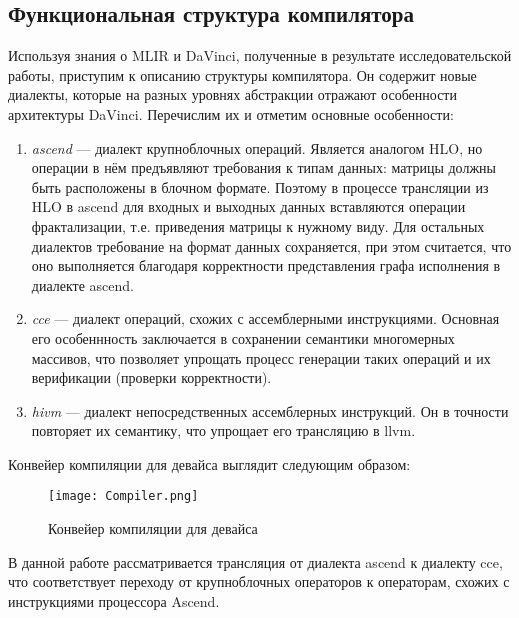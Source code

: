 \subsection{Функциональная структура компилятора}
\label{impl:compiler} %

Используя знания о MLIR и DaVinci, полученные в результате исследовательской
работы, приступим к описанию структуры компилятора. Он содержит новые диалекты,
которые на разных уровнях абстракции отражают особенности архитектуры DaVinci.
Перечислим их и отметим основные особенности:

\begin{enumerate}
    \item \textit{ascend} --- диалект крупноблочных операций. Является аналогом
          HLO, но операции в нём предъявляют требования к типам данных: матрицы
          должны быть расположены в блочном формате. Поэтому в процессе трансляции
          из HLO в ascend для входных и выходных данных вставляются операции
          фрактализации, т.е. приведения матрицы к нужному виду. Для остальных
          диалектов требование на формат данных сохраняется, при этом считается,
          что оно выполняется благодаря корректности представления графа
          исполнения в диалекте ascend.

    \item \textit{cce} --- диалект операций, схожих с ассемблерными инструкциями.
          Основная его особеннность заключается в сохранении семантики
          многомерных массивов, что позволяет упрощать процесс генерации таких
          операций и их верификации (проверки корректности).

    \item \textit{hivm} --- диалект непосредственных ассемблерных инструкций. Он в
          точности повторяет их семантику, что упрощает его трансляцию в llvm.
\end{enumerate}

Конвейер компиляции для девайса выглядит следующим образом:

\begin{figure}[h!]
      \centering
      \texttt{[image: Compiler.png]}
      \caption{Конвейер компиляции для девайса}
  \end{figure}

В данной работе рассматривается трансляция от диалекта ascend к диалекту cce,
что соответствует переходу от крупноблочных операторов к операторам, схожих с
инструкциями процессора Ascend.
